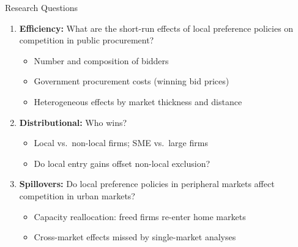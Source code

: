 \documentclass[9pt,aspectratio=169]{beamer}
\begin{document}
\begin{frame}{Research Questions}
\begin{enumerate}
  \item[\textbf{Q1}] \textbf{Efficiency:} What are the short-run effects of local
        preference policies on competition in public procurement?
        \begin{itemize}
          \item Number and composition of bidders
          \item Government procurement costs (winning bid prices)
          \item Heterogeneous effects by market thickness and distance
        \end{itemize}

  \vspace{0.5em}
  \item[\textbf{Q2}] \textbf{Distributional:} Who wins?
        \begin{itemize}
          \item Local vs.\ non-local firms; SME vs.\ large firms
          \item Do local entry gains offset non-local exclusion?
        \end{itemize}

  \vspace{0.5em}
  \item[\textbf{Q3}] \textbf{Spillovers:} Do local preference policies in
        peripheral markets affect competition in urban markets?
        \begin{itemize}
          \item Capacity reallocation: freed firms re-enter home markets
          \item Cross-market effects missed by single-market analyses
        \end{itemize}
\end{enumerate}
\end{frame}
\end{document}
